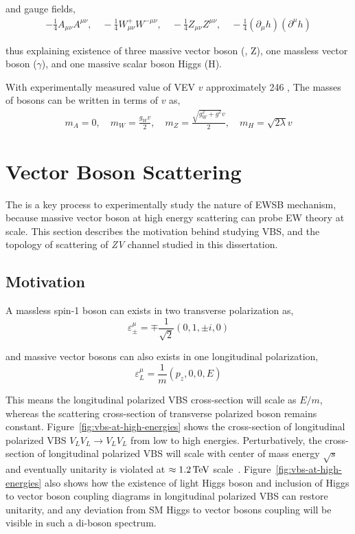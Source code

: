 and gauge fields,
%
\begin{align}
  - \frac{1}{4} A_{\mu \nu} A^{\mu \nu}, \quad
  - \frac{1}{4} W^{+}_{\mu \nu} W^{- \mu \nu}, \quad
  - \frac{1}{4} Z_{\mu \nu} Z^{\mu \nu}, \quad
  - \frac{1}{4} {(\partial_{\mu} h)} {(\partial^{\mu} h)}
\end{align}

thus explaining existence of three massive vector boson (\Wplusminus{}, Z), one massless
vector boson (\( \gamma \)), and one massive scalar boson Higgs (H).

With experimentally measured value of \gls{VEV} \( v \) approximately 246 \GeV{},
The masses of bosons can be written in terms of \( v \) as,
%
\begin{align}
  m_A = 0, \quad
  m_W = \frac{g_{W} v}{2}, \quad
  m_Z = \frac{\sqrt{g^{2}_{W} + g^{2}} v }{2}, \quad
  m_H = \sqrt{2\lambda} v
\end{align}

\section{
  Vector Boson Scattering
 }\label{ch_intro:vbs}

The  is a key process to experimentally study the nature of
\gls{EWSB} mechanism, because massive vector boson at high energy
scattering can probe \gls{EW} theory at \TeV{} scale.
This section describes the motivation behind studying \gls{VBS}, and
the topology of scattering of \textit{ZV} channel studied in this dissertation.

\subsection{Motivation}

A massless spin-1 boson can exists in two transverse polarization as,
%
\begin{equation}
  \varepsilon^{\mu}_{\pm} = \mp \frac{1}{\sqrt{2}} (0, 1, \pm i, 0)
\end{equation}

and massive vector bosons can also exists in one longitudinal polarization,
%
\begin{equation}
  \varepsilon^{\mu}_{L} = \frac{1}{m} (p_z, 0, 0 , E)
\end{equation}

This means the longitudinal polarized \gls{VBS} cross-section will scale as \( E/m \),
whereas the scattering cross-section of transverse polarized boson remains constant.
Figure~\ref{fig:vbs-at-high-energies} shows the cross-section
of longitudinal polarized \gls{VBS} \( V_L V_L \to V_L V_L\)
from low to high energies. Perturbatively, the cross-section of
longitudinal polarized \gls{VBS} will scale with center of mass energy
\( \sqrt{s} \) and eventually unitarity is violated at
\( \approx 1.2 \,\text{Te\hspace{-.08em}V}{} \) scale~\cite{Lee1977,Lee1977a}.
Figure~\ref{fig:vbs-at-high-energies} also shows
how the existence of light Higgs boson and
inclusion of Higgs to vector boson coupling diagrams in longitudinal
polarized \gls{VBS} can restore unitarity,
and any deviation from \gls{SM} Higgs to vector
bosons coupling will be visible in such a di-boson spectrum.

